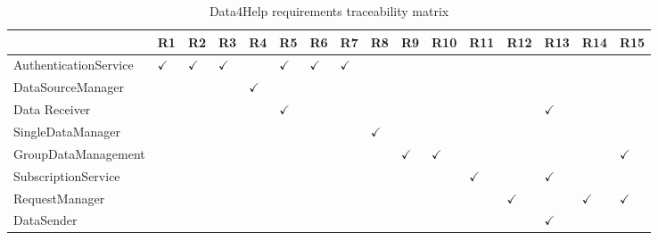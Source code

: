 \begin{table}
\begin{adjustwidth}{-4cm}{}
\captionsetup{justification=centering}
\caption{Data4Help requirements traceability matrix}
  \label{tab:table1}
\begin{tabular}{|l||l|l|l|l|l|l|l|l|l|l|l|l|l|l|l|}
\hline
\cellcolor[HTML]{EFEFEF}                      & \cellcolor[HTML]{EFEFEF} R1 & \cellcolor[HTML]{EFEFEF} R2 & \cellcolor[HTML]{EFEFEF} R3 & \cellcolor[HTML]{EFEFEF} R4 & \cellcolor[HTML]{EFEFEF} R5 & \cellcolor[HTML]{EFEFEF} R6 & \cellcolor[HTML]{EFEFEF} R7 & \cellcolor[HTML]{EFEFEF} R8 & \cellcolor[HTML]{EFEFEF} R9 &\cellcolor[HTML]{EFEFEF}  R10 & \cellcolor[HTML]{EFEFEF} R11 & \cellcolor[HTML]{EFEFEF} R12 & \cellcolor[HTML]{EFEFEF} R13 & \cellcolor[HTML]{EFEFEF} R14 & \cellcolor[HTML]{EFEFEF} R15\\ \hline \hline
\cellcolor[HTML]{EFEFEF}AuthenticationService & $\checkmark$  & $\checkmark$  & $\checkmark$  &    & $\checkmark$  & $\checkmark$  & $\checkmark$  &    &    &     &     &     &     &     & \\ \hline
\cellcolor[HTML]{EFEFEF}DataSourceManager     &    &    &    & $\checkmark$  &    &    &    &    &    &     &     &     &     &     & \\ \hline
\cellcolor[HTML]{EFEFEF}Data Receiver         &    &    &    &    & $\checkmark$  &    &    &    &    &     &     &     & $\checkmark$   &     & \\ \hline
\cellcolor[HTML]{EFEFEF} SingleDataManager    &    &    &    &    &    &    &    & $\checkmark$  &    &     &     &     &     &     & \\ \hline
\cellcolor[HTML]{EFEFEF} GroupDataManagement  &    &    &    &    &    &    &    &    & $\checkmark$  & $\checkmark$   &     &     &     &     & $\checkmark$ \\ \hline
\cellcolor[HTML]{EFEFEF} SubscriptionService  &    &    &    &    &    &    &    &    &    &     & $\checkmark$   &     & $\checkmark$   &     & \\ \hline
\cellcolor[HTML]{EFEFEF} RequestManager       &    &    &    &    &    &    &    &    &    &     &     & $\checkmark$   &     & $\checkmark$   & $\checkmark$ \\ \hline
\cellcolor[HTML]{EFEFEF} DataSender           &    &    &    &    &    &    &    &    &    &     &     &     & $\checkmark$   &     & \\ \hline
\end{tabular}
\end{adjustwidth}
\end{table}


